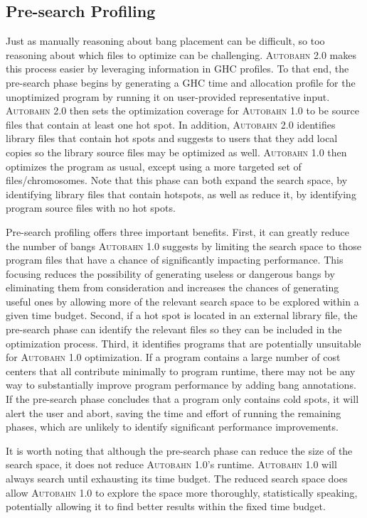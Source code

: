 \documentclass[format=sigplan, review=true, 9pt]{acmart}
\newcommand{\hotspot}[0]{hot spot}
\newcommand{\hotspots}[0]{hot spots}
\newcommand{\coldspots}[0]{cold spots}
\newcommand{\dangerous}[0]{dangerous}
\newcommand{\useful}[0]{useful}
\newcommand{\useless}[0]{useless}
\newcommand{\Ao}[0]{\textsc{Autobahn 1.0}}
\newcommand{\At}[0]{\textsc{Autobahn 2.0}}
\newcommand{\preopt}[0]{pre-search}
\newcommand{\Preopt}[0]{Pre-search}
\begin{document}
\subsection{\Preopt{} Profiling}

Just as manually reasoning about bang placement can be difficult, 
so too reasoning about which files to optimize can be challenging.
\At{} makes this process easier by leveraging information
in GHC profiles.  
To that end, the \preopt{} phase begins by generating a GHC time
and allocation profile for the unoptimized program by running it on 
user-provided representative input.
\At{} then sets the optimization coverage
for \Ao{} to be source files that contain at least one \hotspot{}. 
In addition, 
\At{} identifies library files that contain \hotspots{} and
suggests to users that they add local copies so the library source
files may be optimized as well. 
\Ao{} then optimizes the program as usual, except using a more
targeted set of files/chromosomes.
Note that this phase can both expand the search space, by identifying
library files that contain hotspots, as well as reduce it, by
identifying program source files with no \hotspots{}. 

\Preopt{} profiling offers three important benefits.
First, it can greatly reduce the number of bangs \Ao{} suggests by
limiting the search space to those program files that have a chance of
significantly impacting performance. This focusing reduces the
possibility of generating \useless{} or \dangerous{} bangs by
eliminating them from consideration
and
increases the chances of generating \useful{} ones by allowing more of
the relevant search space to be explored within a given time budget.
Second, if a \hotspot{} is located in an external library file,
the \preopt{} phase can identify the relevant files so they can be
included in the optimization process. 
Third, it identifies programs that are potentially unsuitable for
\Ao{} optimization. If a program contains a large number of cost
centers that all contribute minimally to program runtime, there may
not be any way to substantially improve program performance by adding
bang annotations. If the \preopt{} phase concludes that
a program only contains \coldspots{}, it will alert the user and
abort, saving the time and effort of running the remaining phases, 
which are unlikely to identify significant performance improvements.


It is worth noting that although the \preopt{} phase can reduce the
size of the search space, it does not reduce \Ao{}'s runtime.
\Ao{} will always search until exhausting its time budget. 
The reduced search space does allow \Ao{} to explore the space
more thoroughly, statistically speaking, potentially allowing it to 
find better results within the fixed time budget.
\end{document}
